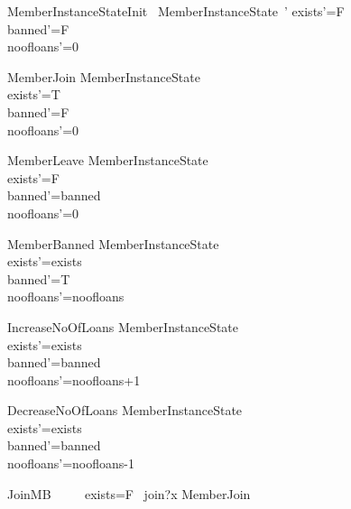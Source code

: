 \documentclass{article}
\begin{document}
\begin{schema}{MemberInstanceStateInit}
    ~MemberInstanceState~'
\where
    exists'=F\\
    banned'=F\\
    noofloans'=0\\
\end{schema}

\begin{schema}{MemberJoin}
   \Delta MemberInstanceState \\
    \where
	exists'=T\\
	banned'=F\\
	noofloans'=0\\
\end{schema}

\begin{schema}{MemberLeave}
   \Delta MemberInstanceState \\
    \where
    	exists'=F\\
	banned'=banned\\
	noofloans'=0\\
\end{schema}

\begin{schema}{MemberBanned}
   \Delta MemberInstanceState \\
    \where
    exists'=exists\\
    banned'=T\\
    noofloans'=noofloans\\
\end{schema}
\begin{schema}{IncreaseNoOfLoans}
   \Delta MemberInstanceState \\
    \where
	exists'=exists\\
	banned'=banned\\
	noofloans'=noofloans+1\\
\end{schema}

\begin{schema}{DecreaseNoOfLoans}
   \Delta MemberInstanceState \\
    \where
	exists'=exists\\
	banned'=banned\\
	noofloans'=noofloans-1\\
\end{schema}


\begin{circusaction}
     JoinMB ~~\circdef~~  \lcircguard exists=F \rcircguard  \circguard\ join?x \then  \lschexpract MemberJoin \rschexpract \\
\end{circusaction}
\end{document}
